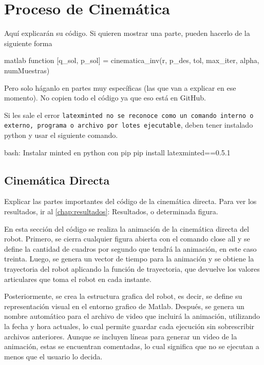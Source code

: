 \section{Proceso de Cinemática} \label{sec:proceso_cinematica}

Aquí explicarán su código. Si quieren mostrar una parte, pueden hacerlo de la siguiente forma

\begin{matlabcode}{matlab}
	function [q_sol, p_sol] = cinematica_inv(r, p_des, tol, max_iter, alpha, numMuestras)
\end{matlabcode}

Pero solo háganlo en partes muy específicas (las que van a explicar en ese momento). No copien todo el código ya que eso está en GitHub.

Si les sale el error \texttt{latexminted no se reconoce como un comando interno o externo, programa o archivo por lotes ejecutable}, deben tener instalado python y usar el siguiente comando.
\begin{terminal}{bash: Instalar minted en python con pip}
	pip install latexminted==0.5.1
\end{terminal}

\subsection{Cinemática Directa}
Explicar las partes importantes del código de la cinemática directa.
Para ver los resultados, ir al \autoref{chap:resultados}: Resultados, o determinada figura.

En esta sección del código se realiza la animación de la cinemática directa del robot. Primero, se cierra cualquier figura abierta con el comando close all y se define la cantidad de cuadros por segundo que tendrá la animación, en este caso treinta. Luego, se genera un vector de tiempo para la animación y se obtiene la trayectoria del robot aplicando la función de trayectoria, que devuelve los valores articulares que toma el robot en cada instante. 

Posteriormente, se crea la estructura grafica del robot, es decir, se define su representación visual en el entorno grafico de Matlab. Después, se genera un nombre automático para el archivo de video que incluirá la animación, utilizando la fecha y hora actuales, lo cual permite guardar cada ejecución sin sobrescribir archivos anteriores. Aunque se incluyen líneas para generar un video de la animación, estas se encuentran comentadas, lo cual significa que no se ejecutan a menos que el usuario lo decida. 

